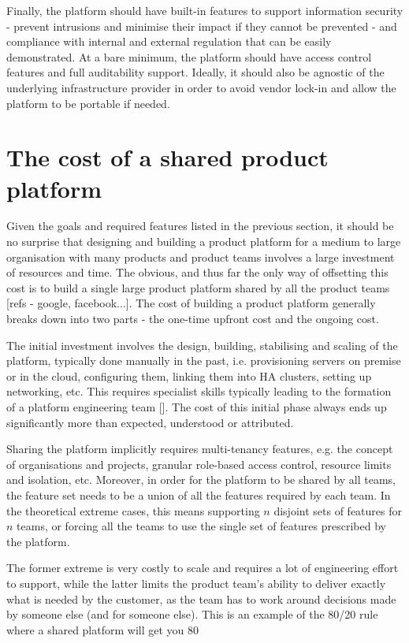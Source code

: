 \documentclass[reprint,amsmath,amssymb,aps]{revtex4-1}
\begin{document}
Finally, the platform should have built-in features to support information security - prevent intrusions and minimise their impact if they cannot be prevented - and compliance with internal and external regulation that can be easily demonstrated. At a bare minimum, the platform should have access control features and full auditability support. Ideally, it should also be agnostic of the underlying infrastructure provider in order to avoid vendor lock-in and allow the platform to be portable if needed.


\section{The cost of a shared product platform}
\label{sec:cost}

Given the goals and required features listed in the previous section, it should be no surprise that designing and building a product platform for a medium to large organisation with many products and product teams involves a large investment of resources and time. The obvious, and thus far the only way of offsetting this cost is to build a single large product platform shared by all the product teams [refs - google, facebook...]. The cost of building a product platform generally breaks down into two parts - the one-time upfront cost and the ongoing cost.

The initial investment involves the design, building, stabilising and scaling of the platform, typically done manually in the past, i.e. provisioning servers on premise or in the cloud, configuring them, linking them into HA clusters, setting up networking, etc. This requires specialist skills typically leading to the formation of a platform engineering team []. The cost of this initial phase always ends up significantly more than expected, understood or attributed.

Sharing the platform implicitly requires multi-tenancy features, e.g. the concept of organisations and projects, granular role-based access control, resource limits and isolation, etc. Moreover, in order for the platform to be shared by all teams, the feature set needs to be a union of all the features required by each team. In the theoretical extreme cases, this means supporting $n$ disjoint sets of features for $n$ teams, or forcing all the teams to use the single set of features prescribed by the platform. 

The former extreme is very costly to scale and requires a lot of engineering effort to support, while the latter limits the product team’s ability to deliver exactly what is needed by the customer, as the team has to work around decisions made by someone else (and for someone else). This is an example of the 80/20 rule where a shared platform will get you 80%
\end{document}
